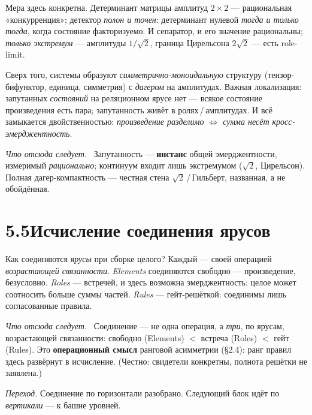 \documentclass[12pt,a4paper]{article}
\newcommand{\rezultat}{\medskip\noindent\emph{Что отсюда следует.}\ }
\begin{document}
Мера здесь конкретна. Детерминант матрицы амплитуд $2{\times}2$ --- рациональная «конкурренция»; детектор
\emph{полон и точен}: детерминант нулевой \emph{тогда и только тогда}, когда состояние факторизуемо. И
сепаратор, и его значение рациональны; \emph{только экстремум} --- амплитуды $1/\sqrt{2}$, граница
Цирельсона $2\sqrt{2}$ --- есть role-limit.

{\sloppy
Сверх того, системы образуют \emph{симметрично-моноидальную} структуру (тензор-бифунктор, единица,
симметрия) с \emph{дагером} на амплитудах. Важная локализация: запутанных \emph{состояний} на
реляционном ярусе нет --- всякое состояние произведения есть пара; запутанность живёт в
ролях\,/\,амплитудах. И всё замыкается двойственностью: \emph{произведение разделимо $\Leftrightarrow$
сумма несёт кросс-эмерджентность}.\par}

\rezultat
Запутанность --- \textbf{инстанс} общей эмерджентности, измеримый \emph{рационально}; континуум входит
лишь экстремумом ($\sqrt{2}$, Цирельсон). Полная дагер-компактность --- честная стена $\sqrt{2}$\,/\,Гильберт,
названная, а не обойдённая.

\section*{5.5\quad Исчисление соединения ярусов}

Как соединяются \emph{ярусы} при сборке целого? Каждый --- своей операцией \emph{возрастающей
связанности}. \emph{Elements} соединяются свободно --- произведение, безусловно. \emph{Roles} ---
встречей, и здесь возможна эмерджентность: целое может соотносить больше суммы частей. \emph{Rules} ---
гейт-решёткой: соединимы лишь согласованные правила.

\rezultat
Соединение --- не одна операция, а \emph{три}, по ярусам, возрастающей связанности: свободно
(Elements) $<$ встреча (Roles) $<$ гейт (Rules). Это \textbf{операционный смысл} ранговой асимметрии
(§2.4): ранг правил здесь развёрнут в исчисление. (Честно: свидетели конкретны, полнота решётки не
заявлена.)

\medskip
\noindent\emph{Переход.} Соединение по горизонтали разобрано. Следующий блок идёт по \emph{вертикали}
--- к башне уровней.

\appendix
\end{document}
